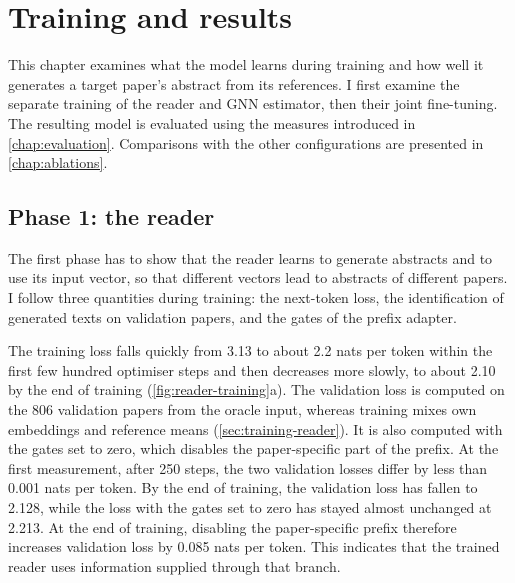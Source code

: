 \chapter{Training and results}
\label{chap:results}

This chapter examines what the model learns during training and how well it generates a target paper's abstract from its references. I first examine the separate training of the reader and GNN estimator, then their joint fine-tuning. The resulting model is evaluated using the measures introduced in \autoref{chap:evaluation}. Comparisons with the other configurations are presented in \autoref{chap:ablations}.

\section{Phase 1: the reader}
\label{sec:results-reader}

The first phase has to show that the reader learns to generate abstracts and to use its input vector, so that different vectors lead to abstracts of different papers. I follow three quantities during training: the next-token loss, the identification of generated texts on validation papers, and the gates of the prefix adapter.

The training loss falls quickly from 3.13 to about 2.2 nats per token within the first few hundred optimiser steps and then decreases more slowly, to about 2.10 by the end of training (\autoref{fig:reader-training}a). The validation loss is computed on the 806 validation papers from the oracle input, whereas training mixes own embeddings and reference means (\autoref{sec:training-reader}). It is also computed with the gates set to zero, which disables the paper-specific part of the prefix. At the first measurement, after 250 steps, the two validation losses differ by less than 0.001 nats per token. By the end of training, the validation loss has fallen to 2.128, while the loss with the gates set to zero has stayed almost unchanged at 2.213. At the end of training, disabling the paper-specific prefix therefore increases validation loss by 0.085 nats per token. This indicates that the trained reader uses information supplied through that branch.

